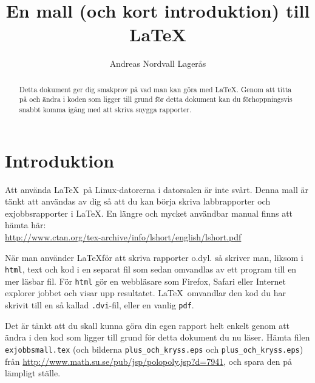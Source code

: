 \documentclass[11pt,a4paper]{article}
\title{En mall (och kort introduktion) till \LaTeX}
\author{Andreas Nordvall Lagerås}
\begin{document}

\maketitle       %

\begin{abstract}
Detta dokument ger dig smakprov på vad man kan göra med \LaTeX. Genom att titta på och ändra i koden som ligger till grund för detta dokument kan du förhoppningsvis snabbt komma igång med att skriva snygga rapporter.
\end{abstract}

\tableofcontents

\section{Introduktion}\label{stycke1}

Att använda \LaTeX\ på Linux-datorerna i datorsalen är inte svårt. Denna mall är tänkt att användas av dig så att du kan börja skriva labbrapporter och exjobbsrapporter i \LaTeX. En längre och mycket användbar manual finns att hämta här:\\
\url{http://www.ctan.org/tex-archive/info/lshort/english/lshort.pdf} 



När man använder \LaTeX för att skriva rapporter o.dyl. så skriver man, liksom i \texttt{html}, text och kod i en separat fil som sedan omvandlas av ett program till en mer läsbar fil. För \texttt{html} gör en webbläsare som Firefox, Safari eller Internet explorer jobbet och visar upp resultatet. \LaTeX\ omvandlar den kod du har skrivit till en så kallad \texttt{.dvi}-fil, eller en vanlig \texttt{pdf}.

Det är tänkt att du skall kunna göra din egen rapport helt enkelt genom att ändra i den kod som ligger till grund för detta dokument du nu läser. Hämta filen \texttt{exjobbsmall.tex} (och bilderna \texttt{plus\_och\_kryss.eps} och  \texttt{plus\_och\_kryss.eps}) från \url{http://www.math.su.se/pub/jsp/polopoly.jsp?d=7941}, och spara den på lämpligt ställe.
\end{document}
